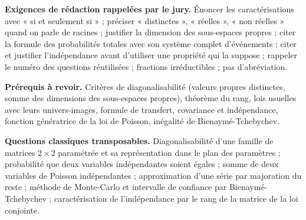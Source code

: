 \documentclass[11pt,a4paper]{article}
\begin{document}
\textbf{Exigences de rédaction rappelées par le jury.} Énoncer les caractérisations avec « si et seulement si » ; préciser « distinctes », « réelles », « non réelles » quand on parle de racines ; justifier la dimension des sous-espaces propres ; citer la formule des probabilités totales avec son système complet d'événements ; citer et justifier l'indépendance avant d'utiliser une propriété qui la suppose ; rappeler le numéro des questions réutilisées ; fractions irréductibles ; pas d'abréviation.

\textbf{Prérequis à revoir.} Critères de diagonalisabilité (valeurs propres distinctes, somme des dimensions des sous-espaces propres), théorème du rang, lois usuelles avec leurs univers-images, formule de transfert, covariance et indépendance, fonction génératrice de la loi de Poisson, inégalité de Bienaymé-Tchebychev.

\textbf{Questions classiques transposables.} Diagonalisabilité d'une famille de matrices \(2\times2\) paramétrée et sa représentation dans le plan des paramètres ; probabilité que deux variables indépendantes soient égales ; somme de deux variables de Poisson indépendantes ; approximation d'une série par majoration du reste ; méthode de Monte-Carlo et intervalle de confiance par Bienaymé-Tchebychev ; caractérisation de l'indépendance par le rang de la matrice de la loi conjointe.
\end{document}
